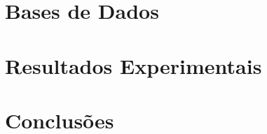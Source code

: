 \documentclass[a4paper,12pt,oneside,openany]{book}
\begin{document}
\chapter{Bases de Dados}
\label{cap5}


\chapter{Resultados Experimentais}
\label{cap6}


\chapter{Conclusões}
\label{cap7}


\normalsize
\cleardoublepage
{}
 



\backmatter
\end{document}
